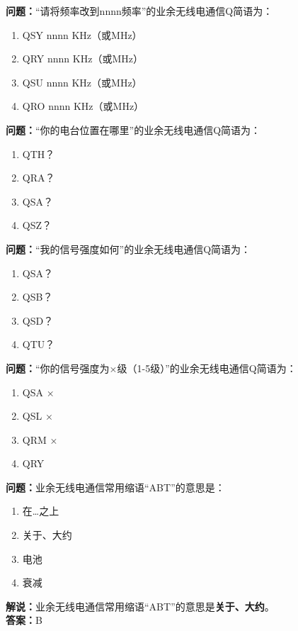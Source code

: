 \bigskip


\noindent\textbf{问题：}“请将频率改到nnnn频率”的业余无线电通信Q简语为：
\begin{enumerate}[label=\Alph*), leftmargin=3em]
\item QSY nnnn KHz（或MHz）
\item QRY nnnn KHz（或MHz）
\item QSU nnnn KHz（或MHz）
\item QRO nnnn KHz（或MHz）
\end{enumerate}

\bigskip


\noindent\textbf{问题：}“你的电台位置在哪里”的业余无线电通信Q简语为：
\begin{enumerate}[label=\Alph*), leftmargin=3em]
\item QTH？
\item QRA？
\item QSA？
\item QSZ？
\end{enumerate}

\bigskip


\noindent\textbf{问题：}“我的信号强度如何”的业余无线电通信Q简语为：
\begin{enumerate}[label=\Alph*), leftmargin=3em]
\item QSA？
\item QSB？
\item QSD？
\item QTU？
\end{enumerate}

\bigskip


\noindent\textbf{问题：}“你的信号强度为×级（1-5级）”的业余无线电通信Q简语为：
\begin{enumerate}[label=\Alph*), leftmargin=3em]
\item QSA ×
\item QSL ×
\item QRM ×
\item QRY
\end{enumerate}

\bigskip


\noindent\textbf{问题：}业余无线电通信常用缩语“ABT”的意思是：
\begin{enumerate}[label=\Alph*), leftmargin=3em]
\item 在…之上
\item 关于、大约
\item 电池
\item 衰减
\end{enumerate}
\noindent\textbf{解说：}业余无线电通信常用缩语“ABT”的意思是\textbf{关于、大约}。\\\noindent\textbf{答案：}B


